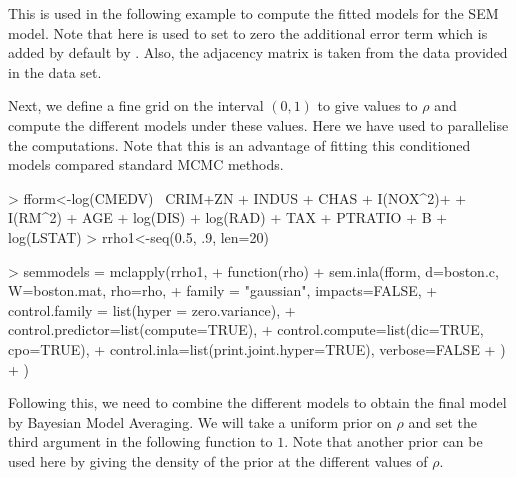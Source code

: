 \documentclass[article]{jss}
\begin{document}
This is used in the following example to compute the fitted models
for the SEM model. Note that here  is used to set
to zero the additional error term which is added by default by .
Also, the adjacency matrix is taken from the data provided in the 
data set.

\begin{Schunk}
\end{Schunk}

Next, we define a fine grid on the interval $(0,1)$ to give values
to $\rho$ and compute the different models under these values. Here
we have used  to parallelise the computations. Note
that this is an advantage of fitting this conditioned models compared 
standard MCMC methods.


\begin{Schunk}
\begin{Sinput}
> fform<-log(CMEDV) ~CRIM+ZN + INDUS + CHAS + I(NOX^2)+
+    I(RM^2) +  AGE + log(DIS) + log(RAD) + TAX + PTRATIO + B + log(LSTAT)
> rrho1<-seq(0.5, .9, len=20)
\end{Sinput}
\end{Schunk}
\begin{Schunk}
\begin{Sinput}
> semmodels = mclapply(rrho1,
+         function(rho) {
+                 sem.inla(fform, d=boston.c, W=boston.mat, rho=rho,
+                         family = "gaussian", impacts=FALSE,
+                         control.family = list(hyper = zero.variance),
+                         control.predictor=list(compute=TRUE),
+                         control.compute=list(dic=TRUE, cpo=TRUE),
+                         control.inla=list(print.joint.hyper=TRUE), verbose=FALSE
+                 )
+         })
\end{Sinput}
\end{Schunk}

\noindent
Following this, we need to combine the different models
to obtain the final model by Bayesian Model Averaging. We will take
a uniform prior on $\rho$ and set the third argument in the following
function to $1$. Note that another prior can be used here by giving
the density of the prior at the different values of $\rho$.
\end{document}

